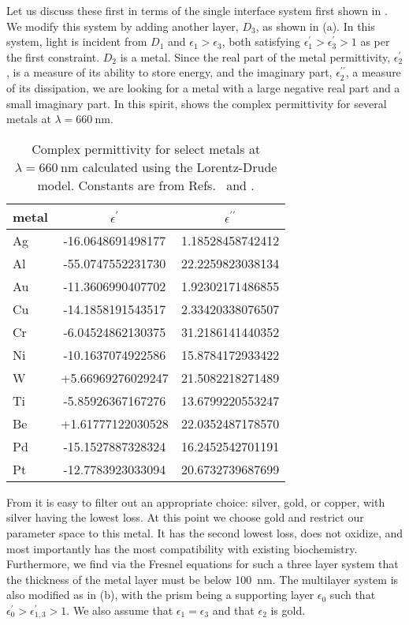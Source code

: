 Let us discuss these first in terms of the single interface system
first shown in .  We modify this system by
adding another layer, $D_3$, as shown in
(a).  In this system, light is incident from
$D_1$ and $\epsilon_1>\epsilon_3$, both satisfying
$\epsilon^\prime_1>\epsilon^\prime_3>1$ as per the first constraint.  $D_2$
is a metal.  Since the real part of the metal permittivity,
$\epsilon_2^\prime$, is a measure of its ability to store energy, and the
imaginary part, $\epsilon_2^{\prime\prime}$, a measure of its dissipation,
we are looking for a metal with a large negative real part and a small
imaginary part.  In this spirit,  shows the complex
permittivity for several metals at $\lambda=\SI{660}{\nano\meter}$.

\begin{table}[ht]
\centering
{}
\begin{tabular}{lSS}
\toprule
metal & {$\epsilon^\prime$} & {$\epsilon^{\prime\prime}$} \\
\midrule
Ag & -16.0648691498177 & 1.18528458742412\\
Al & -55.0747552231730 & 22.2259823038134\\
Au & -11.3606990407702 & 1.92302171486855\\
Cu & -14.1858191543517 & 2.33420338076507\\
Cr & -6.04524862130375 & 31.2186141440352\\
Ni & -10.1637074922586 & 15.8784172933422\\
W  & +5.66969276029247 & 21.5082218271489\\
Ti & -5.85926367167276 & 13.6799220553247\\
Be & +1.61777122030528 & 22.0352487178570\\
Pd & -15.1527887328324 & 16.2452542701191\\
Pt & -12.7783923033094 & 20.6732739687699\\
\bottomrule
\end{tabular}
\caption{Complex permittivity for select metals at
$\lambda=\SI{660}{\nano\meter}$ calculated using the Lorentz-Drude
model.  Constants are from Refs.~\cite{ung2007interference} and
\cite{rakic1998optical}.}
	\label{tbl:epsmetal600}
\end{table}

From  it is easy to filter out an appropriate
choice: silver, gold, or copper, with silver having the lowest loss.  At
this point we choose gold and restrict our parameter space to this metal.
It has the second lowest loss, does not oxidize, and most importantly has
the most compatibility with existing biochemistry.  Furthermore, we find
via the Fresnel equations for such a three layer system that the thickness
of the metal layer must be below \SI{100}{\nano\meter}.  The multilayer
system is also modified as in (b), with the
prism being a supporting layer $\epsilon_0$ such that
$\epsilon^\prime_0>\epsilon^\prime_{1,3}>1$.  We also assume that
$\epsilon_1=\epsilon_3$ and that $\epsilon_2$ is gold.


